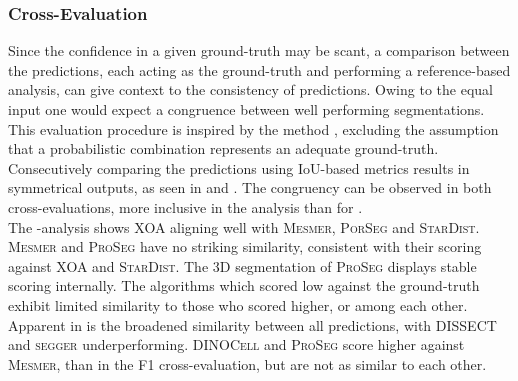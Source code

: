 \subsubsection*{Cross-Evaluation}
Since the confidence in a given ground-truth may be scant, a comparison between the predictions, each acting as the ground-truth and performing a reference-based analysis, can give context to the consistency of predictions. Owing to the equal input one would expect a congruence between well performing segmentations. This evaluation procedure is inspired by the  method \cite{sims_seg_2023}, excluding the assumption that a probabilistic combination represents an adequate ground-truth.\\ %
Consecutively comparing the predictions using IoU-based metrics results in symmetrical outputs, as seen in  and . The congruency can be observed in both cross-evaluations, more inclusive in the  analysis than for .\\
The -analysis shows \textsc{XOA} aligning well with \textsc{Mesmer}, \textsc{PorSeg} and \textsc{StarDist}. \textsc{Mesmer} and \textsc{ProSeg} have no striking similarity, consistent with their scoring against \textsc{XOA} and \textsc{StarDist}. The 3D segmentation of \textsc{ProSeg} displays stable scoring internally. The algorithms which scored low against the ground-truth exhibit limited similarity to those who scored higher, or among each other.\\
Apparent in  is the broadened similarity between all predictions, with \textsc{DISSECT} and \textsc{segger} underperforming. \textsc{DINOCell} and \textsc{ProSeg} score higher against \textsc{Mesmer}, than in the F1 cross-evaluation, but are not as similar to each other.\\
